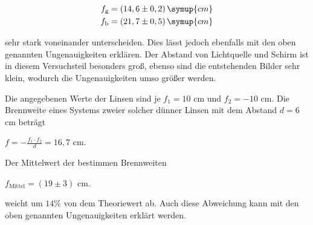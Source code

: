 \begin{align*}
  f_\text{g} &= (14,6 \pm 0,2) \, \symup{cm}\\
  f_\text{b} &= (21,7 \pm 0,5) \, \symup{cm}
\end{align*}

sehr stark voneinander unterscheiden. Dies lässt jedoch ebenfalls mit den oben genannten Ungenauigkeiten erklären.
Der Abstand von Lichtquelle und Schirm ist in diesem Versuchsteil besonders groß, ebenso sind die entstehenden Bilder sehr klein, wodurch die Ungenauigkeiten umso größer werden.

Die angegebenen Werte der Linsen sind je $f_1 = 10$ cm und $f_2 = -10$ cm. Die Brennweite eines Systems zweier solcher dünner Linsen mit dem Abstand $d = 6$ cm beträgt

\begin{center}
  $f = - \frac{f_1 \cdot f_2}{d} = 16,7$ cm.
\end{center}

Der Mittelwert der bestimmen Brennweiten

\begin{center}
  $f_\text{Mittel} = (19 \pm 3)$ cm.
\end{center}

weicht um $14 \%$ von dem Theoriewert ab. Auch diese Abweichung kann mit den oben genannten Ungenauigkeiten erklärt werden.